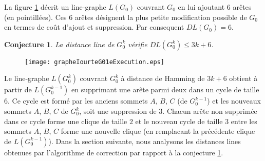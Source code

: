 \documentclass[onecolumn, 12pt]{book}
\newtheorem{conjecture}[theorem]{Conjecture}
\begin{document}
La figure \ref{grapheIourteG01eExecution} d\'ecrit un line-graphe $L(G_0)$ couvrant $G_0$ en lui ajoutant $6$ ar\^etes (en pointill\'ees).
Ces $6$ ar\^etes d\'esignent la plus petite modification possible de $G_0$ en termes de co\^ut d'ajout et suppression.
Par consequent $DL(G_0) = 6$. 
\begin{conjecture}
\label{conjectureDLIourte}
La distance line de $G_0^k$ v\'erifie $DL(G_0^k) \le 3k+6$.
\end{conjecture}
\begin{figure}[htb!] 
\centering
\texttt{[image: grapheIourteG01eExecution.eps]}
\caption{}
\label{grapheIourteG01eExecution} 
\end{figure}
Le line-graphe  $L(G_0^k)$ couvrant $G_0^k$ \`a distance de Hamming de $3k+6$ obtient \`a partir de  $L(G_0^{k-1})$ en supprimant une ar\^ete parmi deux dans un cycle de taille $6$. Ce cycle est form\'e par les anciens sommets $A$, $B$, $C$ (de $G_0^{k-1}$) et les nouveaux sommets $A$, $B$, $C$ de $G_0^k$, soit une suppression de $3$.
Chacun ar\^ete non supprim\'ee dans ce cycle forme une clique de taille $2$ et  le nouveau cycle de taille $3$ entre les sommets $A$, $B$, $C$ forme une nouvelle clique (en remplacant la pr\'ec\'edente clique de $L(G_0^{k-1})$).
\newline
Dans la section suivante, nous analysons les distances lines obtenues par l'algorithme de correction par rapport \`a la conjecture \ref{conjectureDLIourte}.
\end{document}
